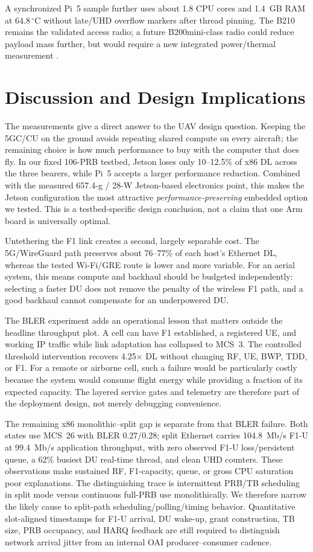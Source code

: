 \documentclass[conference]{IEEEtran}
\begin{document}
A synchronized Pi~5 sample further uses about 1.8 CPU cores and 1.4~GB RAM at
$64.8\,^{\circ}$C without late/UHD overflow markers after thread pinning. The
B210 remains the validated access radio; a future B200mini-class radio could
reduce payload mass further, but would require a new integrated power/thermal
measurement \cite{ettusb210power}.

\section{Discussion and Design Implications}
The measurements give a direct answer to the UAV design question. Keeping the
5GC/CU on the ground avoids repeating shared compute on every aircraft; the
remaining choice is how much performance to buy with the computer that does
fly. In our fixed 106-PRB testbed, Jetson loses only 10--12.5\% of x86 DL
across the three bearers, while Pi~5 accepts a larger performance reduction.
Combined with the measured 657.4-g / 28-W Jetson-based electronics point, this
makes the Jetson configuration the most attractive \emph{performance-preserving}
embedded option we tested. This is a testbed-specific design conclusion, not a
claim that one Arm board is universally optimal.

Untethering the F1 link creates a second, largely separable cost. The
5G/WireGuard path preserves about 76--77\% of each host's Ethernet DL, whereas
the tested Wi-Fi/GRE route is lower and more variable. For an aerial system,
this means compute and backhaul should be budgeted independently: selecting a
faster DU does not remove the penalty of the wireless F1 path, and a good
backhaul cannot compensate for an underpowered DU.

The BLER experiment adds an operational lesson that matters outside the
headline throughput plot. A cell can have F1 established, a registered UE, and
working IP traffic while link adaptation has collapsed to MCS~3. The
controlled threshold intervention recovers 4.25$\times$ DL without changing
RF, UE, BWP, TDD, or F1. For a remote or airborne cell, such a failure would be
particularly costly because the system would consume flight energy while
providing a fraction of its expected capacity. The layered service gates and
telemetry are therefore part of the deployment design, not merely debugging
convenience.

The remaining x86 monolithic--split gap is separate from that BLER failure.
Both states use MCS~26 with BLER 0.27/0.28; split Ethernet carries
104.8~Mb/s F1-U at 99.4~Mb/s application throughput, with zero observed F1-U
loss/persistent queue, a 62\% busiest DU real-time thread,
and clean UHD counters. These observations make sustained RF, F1-capacity,
queue, or gross CPU saturation poor explanations. The distinguishing trace is
intermittent PRB/TB scheduling in split mode versus continuous full-PRB use
monolithically. We therefore narrow the likely cause to split-path
scheduling/polling/timing behavior. Quantitative slot-aligned timestamps for
F1-U arrival, DU wake-up, grant construction, TB size, PRB occupancy, and HARQ
feedback are still required to distinguish network arrival jitter from an
internal OAI producer--consumer cadence.
\end{document}
